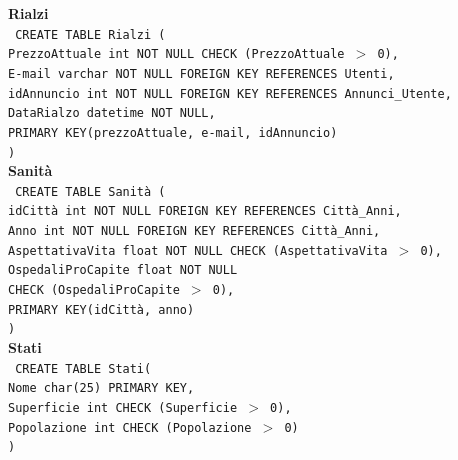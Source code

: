 \documentclass[a4paper,12pt]{report}
\begin{document}
                \noindent
                {\large \textbf{Rialzi}} \\
                \texttt{
                    CREATE TABLE Rialzi ( \\
                    \null\quad\quad PrezzoAttuale   int         NOT NULL CHECK (PrezzoAttuale $>$ 0), \\
                    \null\quad\quad E-mail          varchar     NOT NULL FOREIGN KEY REFERENCES Utenti, \\
                    \null\quad\quad idAnnuncio      int         NOT NULL FOREIGN KEY REFERENCES Annunci\_Utente, \\
                    \null\quad\quad DataRialzo      datetime    NOT NULL, \\
                    \null\quad\quad PRIMARY KEY(prezzoAttuale, e-mail, idAnnuncio) \\
                    )
                } \\

                \noindent
                {\large \textbf{Sanità}} \\
                \texttt{
                    CREATE TABLE Sanità ( \\
                    \null\quad\quad idCittà             int     NOT NULL FOREIGN KEY REFERENCES Città\_Anni, \\
                    \null\quad\quad Anno                int     NOT NULL FOREIGN KEY REFERENCES Città\_Anni, \\
                    \null\quad\quad AspettativaVita     float   NOT NULL CHECK (AspettativaVita $>$ 0), \\
                    \null\quad\quad OspedaliProCapite   float   NOT NULL \\
                            \null\qquad\qquad CHECK (OspedaliProCapite $>$ 0), \\
                    \null\quad\quad PRIMARY KEY(idCittà, anno) \\
                    )
                } \\

                \noindent
                {\large \textbf{Stati}} \\
                \texttt{
                    CREATE TABLE Stati( \\
                    \null\quad\quad Nome            char(25)        PRIMARY KEY, \\
                    \null\quad\quad Superficie      int             CHECK (Superficie $>$ 0), \\
                    \null\quad\quad Popolazione     int             CHECK (Popolazione $>$ 0) \\
                    )   
                } \\
\end{document}
